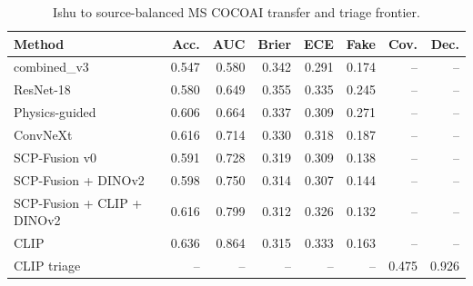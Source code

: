 \begin{table}[t]
\centering
\small
\caption{Ishu to source-balanced MS COCOAI transfer and triage frontier.}
\label{tab:transfer-frontier}
\begin{tabular}{l r r r r r r r}
\toprule
Method & Acc. & AUC & Brier & ECE & Fake & Cov. & Dec. \\
\midrule
combined\_v3 & 0.547 & 0.580 & 0.342 & 0.291 & 0.174 & -- & -- \\
ResNet-18 & 0.580 & 0.649 & 0.355 & 0.335 & 0.245 & -- & -- \\
Physics-guided & 0.606 & 0.664 & 0.337 & 0.309 & 0.271 & -- & -- \\
ConvNeXt & 0.616 & 0.714 & 0.330 & 0.318 & 0.187 & -- & -- \\
SCP-Fusion v0 & 0.591 & 0.728 & 0.319 & 0.309 & 0.138 & -- & -- \\
SCP-Fusion + DINOv2 & 0.598 & 0.750 & 0.314 & 0.307 & 0.144 & -- & -- \\
SCP-Fusion + CLIP + DINOv2 & 0.616 & 0.799 & 0.312 & 0.326 & 0.132 & -- & -- \\
CLIP & 0.636 & 0.864 & 0.315 & 0.333 & 0.163 & -- & -- \\
CLIP triage & -- & -- & -- & -- & -- & 0.475 & 0.926 \\
\bottomrule
\end{tabular}
\end{table}
